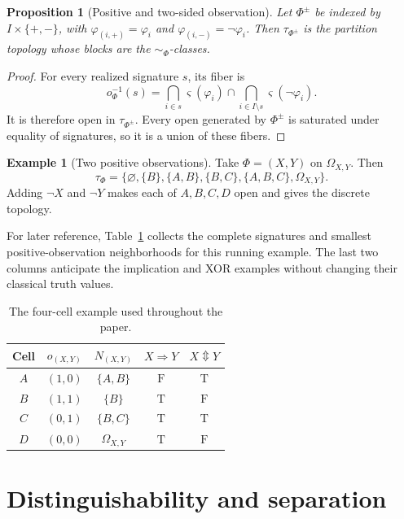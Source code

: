 \documentclass[11pt]{article}
\theoremstyle{definition}
\newtheorem{example}[definition]{Example}
\theoremstyle{plain}
\newtheorem{proposition}[definition]{Proposition}
\theoremstyle{remark}
\newcommand{\True}{\mathrm{T}}
\newcommand{\False}{\mathrm{F}}
\begin{document}
\begin{proposition}[Positive and two-sided observation]\label{prop:two-sided-observation}
Let $\Phi^{\pm}$ be indexed by $I\times\{+,-\}$, with
$\varphi_{(i,+)}=\varphi_i$ and $\varphi_{(i,-)}=\neg\varphi_i$.
Then $\tau_{\Phi^{\pm}}$ is the partition topology whose blocks are the
$\sim_\Phi$-classes.
\end{proposition}

\begin{proof}
For every realized signature $s$, its fiber is
\[
 o_\Phi^{-1}(s)
 =\bigcap_{i\in s}\varsigma(\varphi_i)
  \cap
  \bigcap_{i\in I\setminus s}\varsigma(\neg\varphi_i).
\]
It is therefore open in $\tau_{\Phi^{\pm}}$.  Every open generated by $\Phi^{\pm}$
is saturated under equality of signatures, so it is a union of these fibers.
\end{proof}

\begin{example}[Two positive observations]
Take $\Phi=(X,Y)$ on $\Omega_{X,Y}$.  Then
\[
 \tau_\Phi=
 \{\varnothing,\{B\},\{A,B\},\{B,C\},
   \{A,B,C\},\Omega_{X,Y}\}.
\]
Adding $\neg X$ and $\neg Y$ makes each of $A,B,C,D$ open and gives the
discrete topology.
\end{example}


For later reference, Table~\ref{tab:running-four-cell} collects the complete
signatures and smallest positive-observation neighborhoods for this running
example.  The last two columns anticipate the implication and XOR examples
without changing their classical truth values.

\begin{table}[!ht]
\centering
\small
\renewcommand{\arraystretch}{1.15}
\begin{tabular}{@{}ccccc@{}}
\toprule
Cell & $o_{(X,Y)}$ & $N_{(X,Y)}$ & $X\Rightarrow Y$ & $X\Updownarrow Y$ \\
\midrule
$A$ & $(1,0)$ & $\{A,B\}$ & $\False$ & $\True$ \\
$B$ & $(1,1)$ & $\{B\}$ & $\True$ & $\False$ \\
$C$ & $(0,1)$ & $\{B,C\}$ & $\True$ & $\True$ \\
$D$ & $(0,0)$ & $\Omega_{X,Y}$ & $\True$ & $\False$ \\
\bottomrule
\end{tabular}
\caption{The four-cell example used throughout the paper.}
\label{tab:running-four-cell}
\end{table}

\section{Distinguishability and separation}
\end{document}
